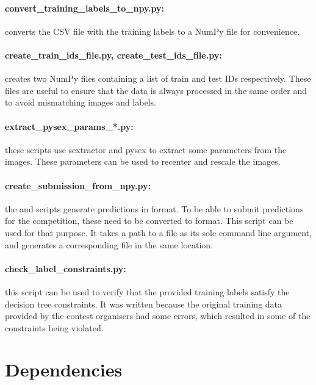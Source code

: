 \documentclass[a4paper,10pt]{article}
\begin{document}
\paragraph{convert\_training\_labels\_to\_npy.py:} converts the CSV file with the training labels to a NumPy file for convenience.

\paragraph{create\_train\_ids\_file.py, create\_test\_ids\_file.py:} creates two NumPy files containing a list of train and test IDs respectively. These files are useful to ensure that the data is always processed in the same order and to avoid mismatching images and labels.

\paragraph{extract\_pysex\_params\_*.py:} these scripts use sextractor and pysex to extract some parameters from the images. These parameters can be used to recenter and rescale the images.

\paragraph{create\_submission\_from\_npy.py:} the  and  scripts generate predictions in  format. To be able to submit predictions for the competition, these need to be converted to  format. This script can be used for that purpose. It takes a path to a  file as its sole command line argument, and generates a corresponding  file in the same location.

\paragraph{check\_label\_constraints.py:} this script can be used to verify that the provided training labels satisfy the decision tree constraints. It was written because the original training data provided by the contest organisers had some errors, which resulted in some of the constraints being violated.

\section{Dependencies}
\label{sec:dependencies}
\end{document}
